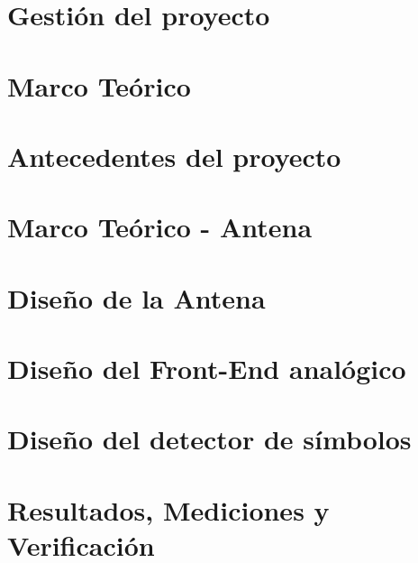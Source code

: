 \documentclass[a4paper,10pt]{article}
\begin{document}
\clearpage
\section{Gestión del proyecto}
\label{sec:gestion}


\clearpage
\section{Marco Teórico}
\label{sec:marco}


\clearpage
\section{Antecedentes del proyecto}
\label{sec:antecedentes}


\clearpage
\section{Marco Teórico - Antena}
\label{sec:antena}


\clearpage
\section{Diseño de la Antena}
\label{sec:antena_dise}


\clearpage
\section{Diseño del Front-End analógico}
\label{sec:analog}


\clearpage
\section{Diseño del detector de símbolos}
\label{sec:digital}



\clearpage
\section{Resultados, Mediciones y Verificación}
\label{sec:resmedver}


\clearpage
\end{document}
